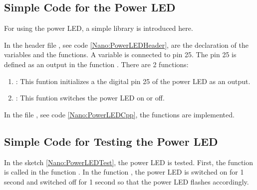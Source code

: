{
    \label{Nano:LEDCpp}
}


\subsection{Simple Code for the Power LED}

For using the power  LED, a simple library is introduced here.

\medskip


In the header file , see code \ref{Nano:PowerLEDHeader}, are the declaration of the variables and the  functions. A variable is connected to pin 25. The pin 25 is defined as an output in the function . There are  2 functions:

\begin{enumerate}
    \item {}: This funtion initializes a the digital pin 25 of the power LED as an output.
    \item {}: This funtion switches the power LED  on or off.
\end{enumerate}

{
    \label{Nano:PowerLEDHeader}
}

In the file , see code \ref{Nano:PowerLEDCpp}, the functions are implemented.

{
    \label{Nano:PowerLEDCpp}
}


\subsection{Simple Code for Testing the Power LED}


In the sketch \ref{Nano:PowerLEDTest}, the power LED is tested. First, the function  is called in the  function . In the function , the power LED is switched on for 1 second and switched off for 1 second so that the power LED flashes accordingly.



